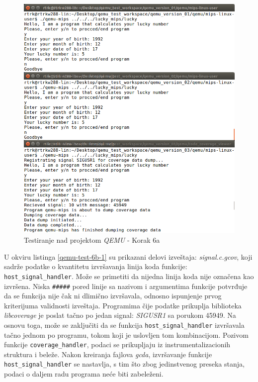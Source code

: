 \documentclass[12pt,oneside]{memoir}
\newcommand{\kod}[1]{\texttt{#1}}
\newcommand{\strano}[1]{\textit{#1}}
\begin{document}
\begin{figure}[!ht]
  \centering
  \includegraphics[width=\textwidth]{img/qemu-test-6a-ng.png}
  \caption{Testiranje nad projektom \strano{QEMU} - Korak 6a}
  \label{fig:qemu-test-6a}
\end{figure} 

\newpage

U okviru listinga \ref{qemu-test-6b-1} su prikazani delovi izveštaja: \strano{signal.c.gcov}, koji sadrže podatke o kvantitetu izvršavanja linija koda funkcije: \kod{host\_signal\_handler}.
Može se primetiti da nijedna linija koda nije označena kao izvršena. Niska \kod{\#\#\#\#\#} pored linije sa nazivom i argumentima funkcije potvrđuje da se funkcija nije čak ni dlimično izvršavala, odnosno ispunjenje prvog kriterijuma validnosti izveštaja. Programima čije podatke prikuplja biblioteka \strano{libcoverage} je poslat tačno po jedan signal: \strano{SIGUSR1} sa porukom 45949. Na osnovu toga, može se zaključiti da se funkcija \kod{host\_signal\_handler} izvršavala tačno jednom po programu, tokom koji je uslovljen tom kombinacijom. Pozivom funkcije \kod{coverage\_handler}, podaci se prikupljaju iz instrumentalizacionih struktura i beleže. Nakon kreiranja fajlova \strano{gcda}, izvršavanje funkcije \kod{host\_signal\_handler} se nastavlja, s tim što zbog jedinstvenog preseka stanja, podaci o daljem radu programa neće biti zabeleženi. 
\\
\end{document}

